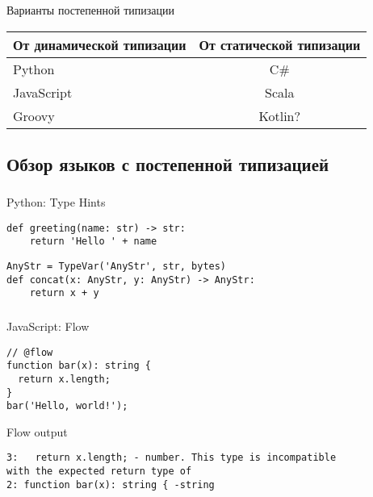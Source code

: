 \documentclass[t]{beamer}  %
\begin{document}
\begin{frame}[fragile]
	\frametitle{\insertsection} 
    \framesubtitle{\insertsubsection}
	\begin{block}{Варианты постепенной типизации}
		\begin{table}
			\begin{tabular}{l | c  }
				От динамической типизации & От статической типизации \\
				\hline \hline
				Python & C\# \\ 
				JavaScript & Scala\\
				Groovy &  Kotlin?  
			\end{tabular}
		\end{table}
    \end{block}
\end{frame}


\subsection{Обзор языков с постепенной типизацией}

\begin{frame}[fragile]
	\frametitle{\insertsection} 
    \framesubtitle{\insertsubsection}
	\begin{block}{Python: Type Hints}
	\begin{verbatim}
def greeting(name: str) -> str:
    return 'Hello ' + name
	\end{verbatim}
    \begin{verbatim}
AnyStr = TypeVar('AnyStr', str, bytes)
def concat(x: AnyStr, y: AnyStr) -> AnyStr:
    return x + y
	\end{verbatim}
    \end{block}
\end{frame}



\begin{frame}[fragile]
	\frametitle{\insertsection} 
    \framesubtitle{\insertsubsection}
\begin{block}{JavaScript: Flow}
	\begin{verbatim}
// @flow
function bar(x): string {
  return x.length;
}
bar('Hello, world!');
	\end{verbatim}
    \begin{alertblock}{Flow output}
    \begin{verbatim}
3:   return x.length; - number. This type is incompatible 
with the expected return type of
2: function bar(x): string { -string 
    \end{verbatim}
    \end{alertblock}
    \end{block}
\end{frame}
\end{document}

